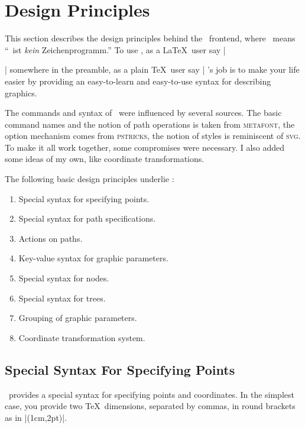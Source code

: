 %
%
%

\section{Design Principles}

This section describes the design principles behind the \tikzname\
frontend, where \tikzname\ means ``\tikzname\ ist \emph{kein}
Zeichenprogramm.'' To use \tikzname, as a \LaTeX\ user say
|\usepackage{tikz}| somewhere in the preamble, as a plain \TeX\ user
say | \tikzname's job is to make your life easier by
providing an easy-to-learn and easy-to-use syntax for describing
graphics. 

The commands and syntax of \tikzname\ were influenced by several
sources. The basic command names and the notion of  path operations is
taken from \textsc{metafont}, the option mechanism comes from
\textsc{pstricks}, the notion of styles is reminiscent of
\textsc{svg}. To make it all work together, some compromises were
necessary. I also added some ideas of my own, like coordinate
transformations.  

The following basic design principles underlie \tikzname:
\begin{enumerate}
\item Special syntax for specifying points.
\item Special syntax for path specifications.
\item Actions on paths.
\item Key-value syntax for graphic parameters.
\item Special syntax for nodes.
\item Special syntax for trees.
\item Grouping of graphic parameters.
\item Coordinate transformation system.
\end{enumerate}



\subsection{Special Syntax For Specifying Points}

\tikzname\ provides a special syntax for specifying points and
coordinates. In the simplest case, you provide two \TeX\ dimensions,
separated by commas, in round brackets as in |(1cm,2pt)|.

